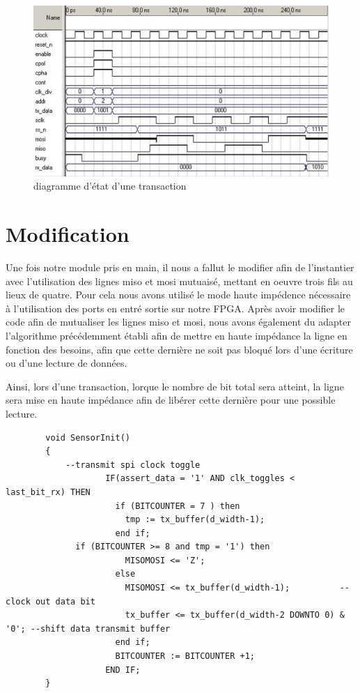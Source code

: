 \documentclass[french,a4paper,12pt]{report}
\begin{document}
	\begin{figure}[!ht]
    \center
  	\includegraphics[width=15cm]{transaction_timing_diagram_web.JPG}
    \caption{diagramme d'état d'une transaction}
	\end{figure}
	
	\section{Modification}
		Une fois notre module pris en main, il nous a fallut le modifier afin de l'instantier avec l'utilisation des lignes miso et mosi mutuaisé, mettant en oeuvre trois fils au lieux de quatre. Pour cela nous avons utilisé le mode haute impédence nécessaire à l'utilisation des ports en entré sortie sur notre FPGA. Après avoir modifier le code afin de mutualiser les lignes miso et mosi, nous avons également du adapter l'algorithme précédemment établi afin de mettre en haute impédance la ligne en fonction des besoins, afin que cette dernière ne soit pas bloqué lors d'une écriture ou d'une lecture de données. 
		
		Ainsi, lors d'une transaction, lorque le nombre de bit total sera atteint, la ligne sera mise en haute impédance afin de libérer cette dernière pour une possible lecture.
		
	\begin{lstlisting}
 		void SensorInit()
		{
			--transmit spi clock toggle
					IF(assert_data = '1' AND clk_toggles < last_bit_rx) THEN
					  if (BITCOUNTER = 7 ) then
					  	tmp := tx_buffer(d_width-1);
					  end if;				
  	          if (BITCOUNTER >= 8 and tmp = '1') then
					  	MISOMOSI <= 'Z';				  
					  else 
					  	MISOMOSI <= tx_buffer(d_width-1);          --clock out data bit
					  	tx_buffer <= tx_buffer(d_width-2 DOWNTO 0) & '0'; --shift data transmit buffer				  
					  end if;				  
					  BITCOUNTER := BITCOUNTER +1;
					END IF;
		}
	\end{lstlisting}
	
\end{document}
